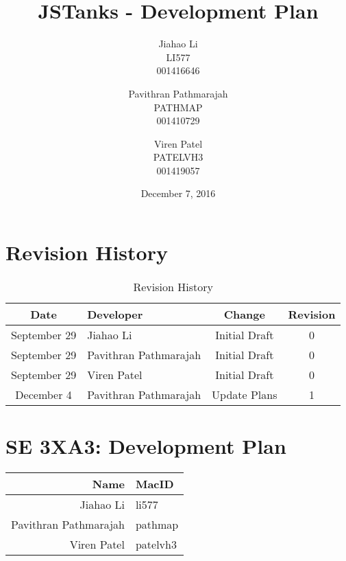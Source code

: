 \documentclass{article}
\begin{document}
\newpage
\title{JSTanks - Development Plan}
\date{December 7, 2016}
\author{Jiahao Li\\LI577\\001416646\and Pavithran Pathmarajah\\PATHMAP\\
001410729 \and Viren Patel\\PATELVH3\\001419057}

\maketitle

\newpage
{}

\section*{Revision History}
\begin{table}[h!]
  \centering
  \caption{Revision History}
  \label{tab:table1}
  \begin{tabular}{clcc}
	\toprule
	Date &  Developer & Change & Revision\\
	\midrule
	September 29&Jiahao Li &Initial Draft &0\\
	September 29&Pavithran Pathmarajah &Initial Draft &0\\
	September 29&Viren Patel  &Initial Draft &0\\
	\midrule
	December 4&Pavithran Pathmarajah &Update Plans &1\\
	\bottomrule
  \end{tabular}
\end{table}



\newpage
{}

\section*{SE 3XA3: Development Plan}

\begin{table}[h!]

  \begin{tabular}{r l}
	\toprule
	Name &  MacID \\
	\midrule
	Jiahao Li & li577 \\
	Pavithran Pathmarajah & pathmap\\
	Viren Patel  & patelvh3\\
	\bottomrule
  \end{tabular}
\end{table}
\end{document}
